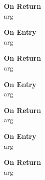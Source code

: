\begin{description}
\item[\bf On Return]
\item[arg] 
\end{description}



%
%


\begin{description}
\item[\bf On Entry]
\item[arg]
\end{description}

\begin{description}
\item[\bf On Return]
\item[arg] 
\end{description}



%
%


\begin{description}
\item[\bf On Entry]
\item[arg]
\end{description}

\begin{description}
\item[\bf On Return]
\item[arg] 
\end{description}



%
%


\begin{description}
\item[\bf On Entry]
\item[arg]
\end{description}

\begin{description}
\item[\bf On Return]
\item[arg] 
\end{description}



